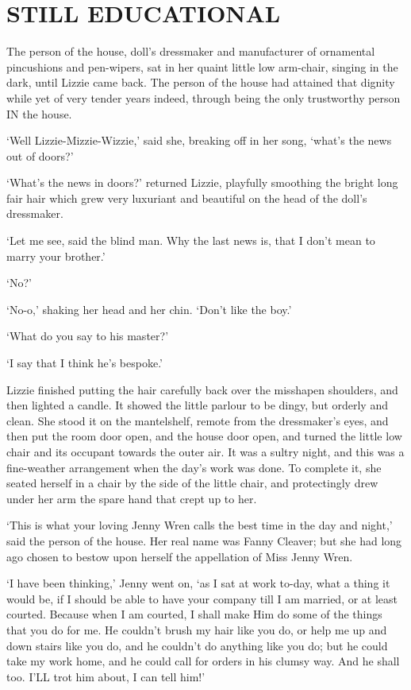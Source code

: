 
\chapter{STILL EDUCATIONAL}

The person of the house, doll’s dressmaker and manufacturer of
ornamental pincushions and pen-wipers, sat in her quaint little low
arm-chair, singing in the dark, until Lizzie came back. The person
of the house had attained that dignity while yet of very tender years
indeed, through being the only trustworthy person IN the house.

‘Well Lizzie-Mizzie-Wizzie,’ said she, breaking off in her song, ‘what’s
the news out of doors?’

‘What’s the news in doors?’ returned Lizzie, playfully smoothing the
bright long fair hair which grew very luxuriant and beautiful on the
head of the doll’s dressmaker.

‘Let me see, said the blind man. Why the last news is, that I don’t mean
to marry your brother.’

‘No?’

‘No-o,’ shaking her head and her chin. ‘Don’t like the boy.’

‘What do you say to his master?’

‘I say that I think he’s bespoke.’

Lizzie finished putting the hair carefully back over the misshapen
shoulders, and then lighted a candle. It showed the little parlour to
be dingy, but orderly and clean. She stood it on the mantelshelf, remote
from the dressmaker’s eyes, and then put the room door open, and the
house door open, and turned the little low chair and its occupant
towards the outer air. It was a sultry night, and this was a
fine-weather arrangement when the day’s work was done. To complete
it, she seated herself in a chair by the side of the little chair, and
protectingly drew under her arm the spare hand that crept up to her.

‘This is what your loving Jenny Wren calls the best time in the day and
night,’ said the person of the house. Her real name was Fanny Cleaver;
but she had long ago chosen to bestow upon herself the appellation of
Miss Jenny Wren.

‘I have been thinking,’ Jenny went on, ‘as I sat at work to-day, what
a thing it would be, if I should be able to have your company till I am
married, or at least courted. Because when I am courted, I shall make
Him do some of the things that you do for me. He couldn’t brush my hair
like you do, or help me up and down stairs like you do, and he couldn’t
do anything like you do; but he could take my work home, and he could
call for orders in his clumsy way. And he shall too. I’LL trot him
about, I can tell him!’


